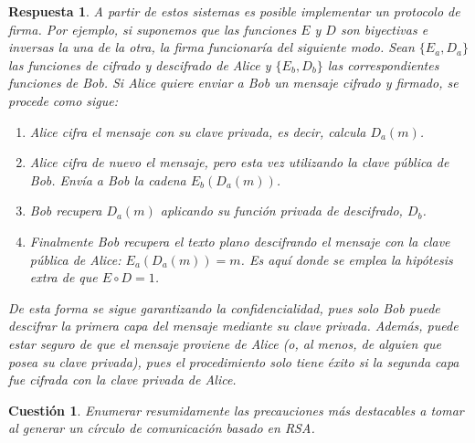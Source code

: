 \documentclass[
  a4paper,
  spanish,
  12pt,
]{scrartcl}
\theoremstyle{ejercicio-style}
\newtheorem{ejer}{Cuestión}
\theoremstyle{remark-style}
\newtheorem*{sol}{Respuesta}
\theoremstyle{teorema-style}
\begin{document}
\begin{sol}
  A partir de estos sistemas es posible implementar un protocolo de firma.
  Por ejemplo, si suponemos que las funciones $E$ y $D$ son biyectivas e inversas la una de la otra, la firma funcionaría del siguiente modo. Sean $\{ E_a, D_a \}$ las funciones de cifrado y descifrado de Alice y $\{ E_b, D_b \}$ las correspondientes funciones de Bob. Si Alice quiere enviar a Bob un mensaje cifrado y firmado, se procede como sigue:

  \begin{enumerate}
    \item Alice cifra el mensaje con su clave privada, es decir, calcula $D_a(m)$.
    \item Alice cifra de nuevo el mensaje, pero esta vez utilizando la clave pública de Bob. Envía a Bob la cadena $E_b(D_a(m))$.
    \item Bob recupera $D_a(m)$ aplicando su función privada de descifrado, $D_b$.
    \item Finalmente Bob recupera el texto plano descifrando el mensaje con la clave pública de Alice: $E_a(D_a(m)) = m$. Es aquí donde se emplea la hipótesis extra de que $E \circ D = 1$.
  \end{enumerate}

  De esta forma se sigue garantizando la confidencialidad, pues solo Bob puede descifrar la primera capa del mensaje mediante su clave privada. Además, puede estar seguro de que el mensaje proviene de Alice (o, al menos, de alguien que posea su clave privada), pues el procedimiento solo tiene éxito si la segunda capa fue cifrada con la clave privada de Alice.

\end{sol}

\begin{ejer}
  Enumerar resumidamente las precauciones más destacables a tomar al generar un círculo de comunicación basado en RSA.
\end{ejer}
\end{document}
